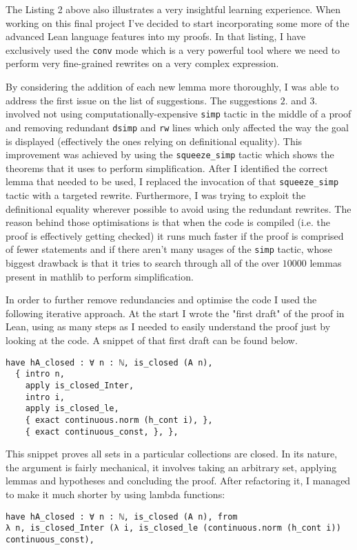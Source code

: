 \documentclass[11pt]{article}
\newenvironment{code}{\captionsetup{type=listing}}{}
\begin{document}
The Listing 2 above also illustrates a very insightful learning experience. When
working on this final project I've decided to start incorporating some more of
the advanced Lean language features into my proofs. In that listing, I have
exclusively used the \texttt{conv} mode which is a very powerful tool where we need
to perform very fine-grained rewrites on a very complex expression.

By considering the addition of each new lemma more thoroughly, I was able to
address the first issue on the list of suggestions. The suggestions $2.$ and
$3.$ involved not using computationally-expensive \texttt{simp} tactic in the
middle of a proof and removing redundant \texttt{dsimp} and \texttt{rw} lines
which only affected the way the goal is displayed (effectively the ones relying
on definitional equality). This improvement was achieved by using the
\texttt{squeeze\_simp} tactic which shows the theorems that it uses to perform
simplification. After I identified the correct lemma that needed to be used, I
replaced the invocation of that \texttt{squeeze\_simp} tactic with a targeted
rewrite. Furthermore, I was trying to exploit the definitional equality
wherever possible to avoid using the redundant rewrites. The reason behind
those optimisations is that when the code is compiled (i.e. the proof is
effectively getting checked) it runs much faster if the proof is comprised of
fewer statements and if there aren't many usages of the \texttt{simp} tactic,
whose biggest drawback is that it tries to search through all of the over
$10000$ lemmas present in mathlib to perform simplification.

In order to further remove redundancies and optimise the code I used the
following iterative approach. At the start I wrote the "first draft" of the
proof in Lean, using as many steps as I needed to easily understand the proof
just by looking at the code. A snippet of that first draft can be found below.

\begin{code}
\begin{verbatim}
have hA_closed : ∀ n : ℕ, is_closed (A n),
  { intro n,
    apply is_closed_Inter,
    intro i,
    apply is_closed_le,
    { exact continuous.norm (h_cont i), },
    { exact continuous_const, }, },
\end{verbatim}
\end{code}

This snippet proves all sets in a particular collections are closed. In its nature,
the argument is fairly mechanical, it involves taking an arbitrary set, applying
lemmas and hypotheses and concluding the proof. After refactoring it, I managed
to make it much shorter by using lambda functions:
\begin{code}
\begin{verbatim}
have hA_closed : ∀ n : ℕ, is_closed (A n), from
λ n, is_closed_Inter (λ i, is_closed_le (continuous.norm (h_cont i)) continuous_const),
\end{verbatim}
\end{code}
\end{document}
